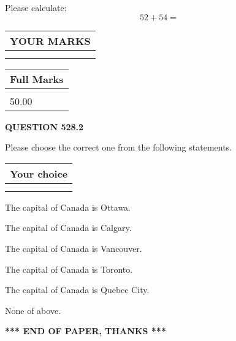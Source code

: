 \documentclass[12pt]{article}
\begin{document}
  
 
Please calculate:
\begin{equation}
52 +  %
54 = \nonumber
\end{equation}
 

 

 
  
\vspace{0.2in}
  
\noindent\begin{tabular}{|l|}
\hline
 YOUR MARKS  \\
\hline
 \\ 
 \\ 
\hline
\end{tabular}
\hspace{0.05in} \begin{tabular}{|l|}
\hline
 Full Marks  \\
\hline
 \\ 
50.00 \\
\hline
\end{tabular}
{\textbf{\Large{QUESTION
528.2 
}}}
  
  
Please choose the correct one from the following statements.
  
  
\noindent\hspace{3.0in} \begin{tabular}{|l|}
\hline
Your choice \\
\hline
 \\ 
 \\ 
\hline
\end{tabular}
  
  
 
 
The capital of Canada is Ottawa.
 
 
The capital of Canada is Calgary.
 
 
The capital of Canada is Vancouver.
 
 
The capital of Canada is Toronto.
 
 
The capital of Canada is Quebec City.
 
 
 None of above.
 
 
   
   
 \vspace{0.2in}
 
   
   
   
   
\vspace{1.0in} 
{\textbf{\large{ *** END OF PAPER, THANKS *** }}} 
   
\end{document}

